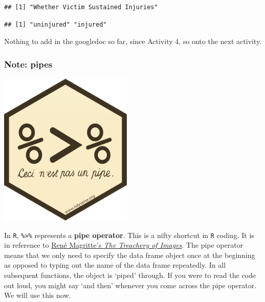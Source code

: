 \documentclass[
]{book}
\newenvironment{Shaded}{\begin{snugshade}}{\end{snugshade}}
\newcommand{\AttributeTok}[1]{\textcolor[rgb]{0.77,0.63,0.00}{#1}}
\newcommand{\CommentTok}[1]{\textcolor[rgb]{0.56,0.35,0.01}{\textit{#1}}}
\newcommand{\DecValTok}[1]{\textcolor[rgb]{0.00,0.00,0.81}{#1}}
\newcommand{\FunctionTok}[1]{\textcolor[rgb]{0.00,0.00,0.00}{#1}}
\newcommand{\NormalTok}[1]{#1}
\newcommand{\OtherTok}[1]{\textcolor[rgb]{0.56,0.35,0.01}{#1}}
\newcommand{\SpecialCharTok}[1]{\textcolor[rgb]{0.00,0.00,0.00}{#1}}
\newcommand{\StringTok}[1]{\textcolor[rgb]{0.31,0.60,0.02}{#1}}
\begin{document}
\begin{verbatim}
## [1] "Whether Victim Sustained Injuries"
\end{verbatim}

\begin{Shaded}
\end{Shaded}

\begin{verbatim}
## [1] "uninjured" "injured"
\end{verbatim}

Nothing to add in the googledoc so far, since Activity 4, so onto the next activity.

\hypertarget{note-pipes}{%
\subsubsection{Note: pipes}\label{note-pipes}}

\includegraphics{Images/logo_pipe.png}

In \texttt{R}, \texttt{\%\textgreater{}\%} represents a \textbf{pipe operator}. This is a nifty shortcut in \texttt{R} coding. It is in reference to \href{https://blog.revolutionanalytics.com/2014/07/magrittr-simplifying-r-code-with-pipes.html}{René Magritte's \emph{The Treachery of Images}}. The pipe operator means that we only need to specify the data frame object once at the beginning as opposed to typing out the name of the data frame repeatedly. In all subsequent functions, the object is `piped' through. If you were to read the code out loud, you might say `and then' whenever you come across the pipe operator. We will use this now.
\end{document}
